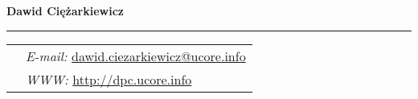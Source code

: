 \documentclass[10pt]{article}
\newcommand{\makeheading}[1]%
        {\hspace*{-\marginparsep minus \marginparwidth}%
         \begin{minipage}[t]{\textwidth+\marginparwidth+\marginparsep}%
                {\large \bfseries #1}\hfill {\scriptsize }\\[-0.15\baselineskip]%
                 \rule{\columnwidth}{1pt}%
         \end{minipage}
}
\renewcommand{\section}[2]%
        {\pagebreak[2]\vspace{1.4\baselineskip}%
         \phantomsection\addcontentsline{toc}{section}{#1}%
         \hspace{0in}%
         \marginpar{
         \raggedright \scshape #1}#2}
\begin{document}
\makeheading{Dawid Ciężarkiewicz}


%
%
%
\newlength{\rcollength}\setlength{\rcollength}{2.55in}%
%
\begin{tabular}[t]{@{}p{\textwidth-\rcollength}p{\rcollength}}


\\

& \textit{E-mail:}
\href{mailto:dawid.ciezarkiewicz@ucore.info}{dawid.ciezarkiewicz@ucore.info}\\
   & \textit{WWW:}
\href{http://dpc.ucore.info/}{http://dpc.ucore.info}\\
\end{tabular}


\end{document}
